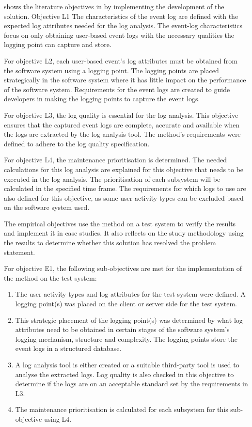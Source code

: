  shows the literature objectives in  by implementing the development of the solution. Objective L1 The characteristics of the event log are defined with the expected log attributes needed for the log analysis. The event-log characteristics focus on only obtaining user-based event logs with the necessary qualities the logging point can capture and store.\par For objective L2, each user-based event's log attributes must be obtained from the software system using a logging point. The logging points are placed strategically in the software system where it has little impact on the performance of the software system. Requirements for the event logs are created to guide developers in making the logging points to capture the event logs.\par For objective L3, the log quality is essential for the log analysis. This objective ensures that the captured event logs are complete, accurate and available when the logs are extracted by the log analysis tool. The method's requirements were defined to adhere to the log quality specification.\par For objective L4, the maintenance prioritisation is determined. The needed calculations for this log analysis are explained for this objective that needs to be executed in the log analysis. The prioritisation of each subsystem will be calculated in the specified time frame. The requirements for which logs to use are also defined for this objective, as some user activity types can be excluded based on the software system used.\par The empirical objectives use the method on a test system to verify the results and implement it in case studies. It also reflects on the study methodology using the results to determine whether this solution has resolved the problem statement.\par For objective E1, the following sub-objectives are met for the implementation of the method on the test system:

\begin{enumerate}
	\item The user activity types and log attributes for the test system were defined. A logging point(s) was placed on the client or server side for the test system.
	\item This strategic placement of the logging point(s) was determined by what log attributes need to be obtained in certain stages of the software system's logging mechanism, structure and complexity. The logging points store the event logs in a structured database.
	\item A log analysis tool is either created or a suitable third-party tool is used to analyse the extracted logs. Log quality is also checked in this objective to determine if the logs are on an acceptable standard set by the requirements in L3. 
	\item The maintenance prioritisation is calculated for each subsystem for this sub-objective using L4.
\end{enumerate} 

